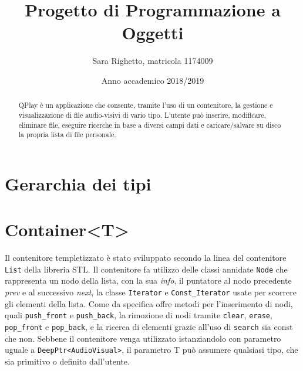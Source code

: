 

\title{Progetto di Programmazione a Oggetti}
\author{Sara Righetto, matricola 1174009}
\date{Anno accademico 2018/2019}


    \maketitle
    \begin{abstract}
        QPlay è un applicazione che consente, tramite l'uso di un contenitore, la gestione e visualizzazione di file audio-visivi di vario tipo. L'utente può inserire, modificare, eliminare file, eseguire ricerche in base a diversi campi dati e caricare/salvare su disco la propria lista di file personale.
    \end{abstract}

    \section*{Gerarchia dei tipi}
        

    \section*{Container<T>}
        Il contenitore templetizzato è stato sviluppato secondo la linea del contenitore \texttt{List} della libreria STL. \newline
        Il contenitore fa utilizzo delle classi annidate \texttt{Node} che rappresenta un nodo della lista, con la sua \textit{info}, il puntatore al nodo precedente \textit{prev} e al successivo \textit{next}, la classe \texttt{Iterator} e \texttt{Const\_Iterator} usate per scorrere gli elementi della lista.
        Come da specifica offre metodi per l'inserimento di nodi, quali \texttt{push\_front} e \texttt{push\_back}, la rimozione di nodi tramite \texttt{clear}, \texttt{erase}, \texttt{pop\_front} e \texttt{pop\_back}, e la ricerca di elementi grazie all'uso di \texttt{search} sia const che non. \newline
        Sebbene il contenitore venga utilizzato istanziandolo con parametro uguale a \texttt{DeepPtr<AudioVisual>}, il parametro T può assumere qualsiasi tipo, che sia primitivo o definito dall'utente.

